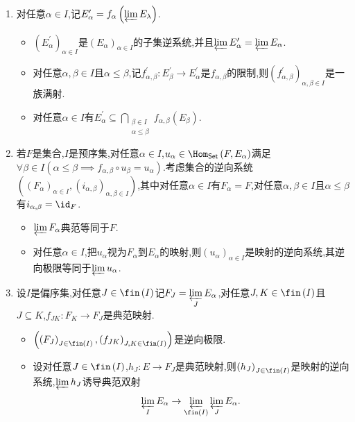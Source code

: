 \begin{remark}{}{}
	\begin{enumerate}
		\item 对任意$\alpha\in I$,记$E_{\alpha}^{\prime}=f_{\alpha}\left(\varprojlim E_{\lambda}\right)$.
		\begin{itemize}
			\item $\left(E_{\alpha}^{\prime}\right)_{\alpha\in I}$是$\left(E_{\alpha}\right)_{\alpha\in I}$的子集逆系统,并且$\varprojlim E_{\alpha}^{\prime}=\varprojlim E_{\alpha}$.
			\item 对任意$\alpha,\beta\in I$且$\alpha\leq\beta$,记$f_{\alpha,\beta}^{\prime}:E_{\beta}^{\prime}\to E_{\alpha}^{\prime}$是$f_{\alpha,\beta}$的限制,则$\left(f_{\alpha,\beta}^{\prime}\right)_{\alpha,\beta\in I}$是一族满射.
			\item 对任意$\alpha\in I$有$E_{\alpha}^{\prime}\subseteq\bigcap\limits_{\substack{\beta\in I\\ \alpha\leq\beta}}f_{\alpha,\beta}\left(E_{\beta}\right)$.
		\end{itemize}
		\item 若$F$是集合,$I$是预序集,对任意$\alpha\in I$,$u_{\alpha}\in\Hom_{\mathsf{Set}}\left(F,E_{\alpha}\right)$满足$\forall\beta\in I\left(\alpha\leq\beta\implies f_{\alpha,\beta}\circ u_{\beta}=u_{\alpha}\right)$.考虑集合的逆向系统$\left(\left(F_{\alpha}\right)_{\alpha\in I},\left(i_{\alpha,\beta}\right)_{\alpha,\beta\in I}\right)$,其中对任意$\alpha\in I$有$F_{\alpha}=F$,对任意$\alpha,\beta\in I$且$\alpha\leq\beta$有$i_{\alpha,\beta}=\id_{F}$.
		\begin{itemize}
			\item $\varprojlim F_{\alpha}$典范等同于$F$.
			\item 对任意$\alpha\in I$,把$u_{\alpha}$视为$F_{\alpha}$到$E_{\alpha}$的映射,则$\left(u_{\alpha}\right)_{\alpha\in I}$是映射的逆向系统,其逆向极限等同于$\varprojlim u_{\alpha}$.
		\end{itemize}
		\item 设$I$是偏序集,对任意$J\in\fin\left(I\right)$记$F_{J}=\varprojlim\limits_{J}E_{\alpha}$,对任意$J,K\in\fin\left(I\right)$且$J\subseteq K$,$f_{JK}:F_{K}\to F_{J}$是典范映射.
		\begin{itemize}
			\item $\left(\left(F_{J}\right)_{J\in\fin\left(I\right)},\left(f_{JK}\right)_{J,K\in\fin\left(I\right)}\right)$是逆向极限.
			\item 设对任意$J\in\fin\left(I\right)$,$h_{J}:E\to F_{J}$是典范映射,则$\left(h_{J}\right)_{J\in\fin\left(I\right)}$是映射的逆向系统,$\varprojlim h_{J}$诱导典范双射
			\begin{align*}
				\varprojlim\limits_{I}E_{\alpha}\to\varprojlim\limits_{\fin\left(I\right)}\varprojlim\limits_{J}E_{\alpha}.
			\end{align*}
		\end{itemize}
	\end{enumerate}
\end{remark}
